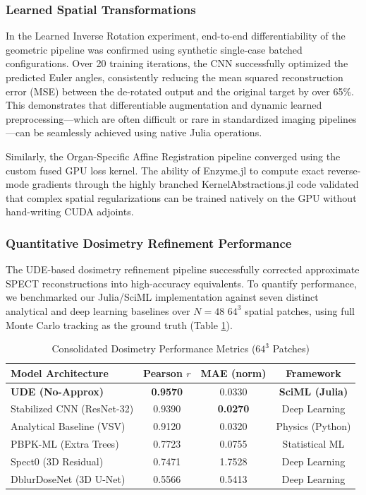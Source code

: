 \documentclass[10pt,letterpaper]{article}
\begin{document}
\subsubsection*{Learned Spatial Transformations}
In the Learned Inverse Rotation experiment, end-to-end differentiability of the geometric pipeline was confirmed using synthetic single-case batched configurations. Over 20 training iterations, the CNN successfully optimized the predicted Euler angles, consistently reducing the mean squared reconstruction error (MSE) between the de-rotated output and the original target by over 65\%. This demonstrates that differentiable augmentation and dynamic learned preprocessing---which are often difficult or rare in standardized imaging pipelines \cite{Shi_2023}---can be seamlessly achieved using native Julia operations.

Similarly, the Organ-Specific Affine Registration pipeline converged using the custom fused GPU loss kernel. The ability of Enzyme.jl to compute exact reverse-mode gradients through the highly branched KernelAbstractions.jl code validated that complex spatial regularizations can be trained natively on the GPU without hand-writing CUDA adjoints.

\subsubsection*{Quantitative Dosimetry Refinement Performance}
The UDE-based dosimetry refinement pipeline successfully corrected approximate SPECT reconstructions into high-accuracy equivalents. To quantify performance, we benchmarked our Julia/SciML implementation against seven distinct analytical and deep learning baselines over $N=48$ $64^3$ spatial patches, using full Monte Carlo tracking as the ground truth (Table \ref{tab:dosimetry_metrics}).

\begin{table}[H]
\centering
\caption{Consolidated Dosimetry Performance Metrics ($64^3$ Patches)}
\begin{tabular}{lccc}
\toprule
\textbf{Model Architecture} & \textbf{Pearson $r$} & \textbf{MAE (norm)} & \textbf{Framework} \\ \midrule
\textbf{UDE (No-Approx)} & \textbf{0.9570} & 0.0330 & \textbf{SciML (Julia)} \\
Stabilized CNN (ResNet-32) & 0.9390 & \textbf{0.0270} & Deep Learning \\
Analytical Baseline (VSV) & 0.9120 & 0.0320 & Physics (Python) \\
PBPK-ML (Extra Trees) & 0.7723 & 0.0755 & Statistical ML \\
Spect0 (3D Residual) & 0.7471 & 1.7528 & Deep Learning \\
DblurDoseNet (3D U-Net) & 0.5566 & 0.5413 & Deep Learning \\
\bottomrule
\end{tabular}
\label{tab:dosimetry_metrics}
\end{table}
\end{document}
